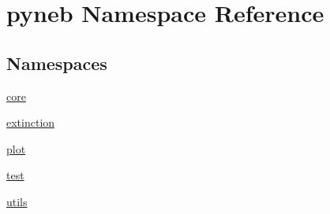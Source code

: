 \hypertarget{namespacepyneb}{}\section{pyneb Namespace Reference}
\label{namespacepyneb}
\subsection*{Namespaces}
\begin{DoxyCompactItemize}
\item 
 \hyperlink{namespacepyneb_1_1core}{core}
\item 
 \hyperlink{namespacepyneb_1_1extinction}{extinction}
\item 
 \hyperlink{namespacepyneb_1_1plot}{plot}
\item 
 \hyperlink{namespacepyneb_1_1test}{test}
\item 
 \hyperlink{namespacepyneb_1_1utils}{utils}
\end{DoxyCompactItemize}
